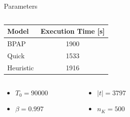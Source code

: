 \documentclass[aspectratio=169,dvipsnames]{beamer}
\begin{document}
\begin{frame}[label={sec:org29ce8c6}]{Parameters}
\begin{columns}
\begin{column}{0.5\columnwidth}

\begin{center}
\begin{tabular}{l|c}
\hline
\alert{Model} & \alert{Execution Time} [s]\\[0pt]
\hline
BPAP & 1900\\[0pt]
Quick & 1533\\[0pt]
Heuristic & 1916\\[0pt]
\hline
\end{tabular}
\end{center}

\begin{columns}
\begin{column}{0.5\columnwidth}
\begin{itemize}
\item \(T_0 = 90000\)
\item \(\beta = 0.997\)
\end{itemize}
\end{column}

\begin{column}{0.5\columnwidth}
\begin{itemize}
\item \(|t| = 3797\)
\item \(n_K = 500\)
\end{itemize}
\end{column}
\end{columns}
\end{column}

\begin{column}{0.5\columnwidth}
\begin{figure}
    \centering
\end{figure}
\end{column}
\end{columns}
\end{frame}
\end{document}
